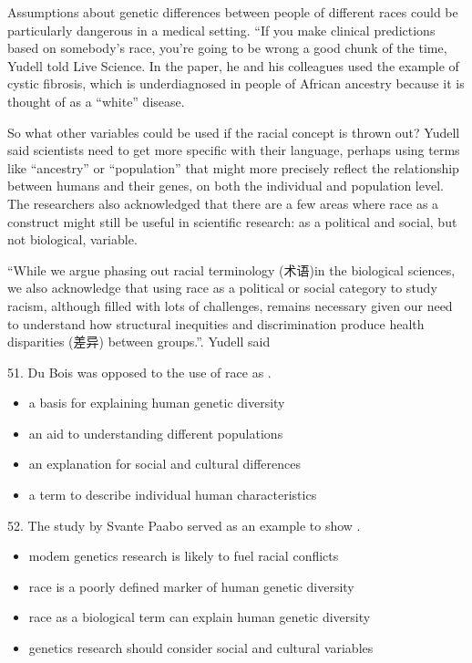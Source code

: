 \documentclass[UTF8,11pt]{ctexart}
\begin{document}
Assumptions about genetic differences between people of different races could be particularly dangerous in a medical setting. “If you make clinical predictions based on somebody’s race, you’re going to be wrong a good chunk of the time, Yudell told Live Science. In the paper, he and his colleagues used the example of cystic fibrosis, which is underdiagnosed in people of African ancestry because it is thought of as a “white” disease.


So what other variables could be used if the racial concept is thrown out? Yudell said scientists need to get more specific with their language, perhaps using terms like “ancestry” or “population” that might more precisely reflect the relationship between humans and their genes, on both the individual and population level. The researchers also acknowledged that there are a few areas where race as a construct might still be useful in scientific research: as a political and social, but not biological, variable.


“While we argue phasing out racial terminology (术语)in the biological sciences, we also acknowledge that using race as a political or social category to study racism, although filled with lots of challenges, remains necessary given our need to understand how structural inequities and discrimination produce health disparities (差异) between groups.”. Yudell said


51. Du Bois was opposed to the use of race as .


\begin{itemize}[leftmargin=2em,itemsep=.2em,topsep=.4em]\item[A.] a basis for explaining human genetic diversity
\item[B.] an aid to understanding different populations
\item[C.] an explanation for social and cultural differences
\item[D.] a term to describe individual human characteristics
\end{itemize}

52. The study by Svante Paabo served as an example to show .


\begin{itemize}[leftmargin=2em,itemsep=.2em,topsep=.4em]\item[A.] modem genetics research is likely to fuel racial conflicts
\item[B.] race is a poorly defined marker of human genetic diversity
\item[C.] race as a biological term can explain human genetic diversity
\item[D.] genetics research should consider social and cultural variables
\end{itemize}
\end{document}
